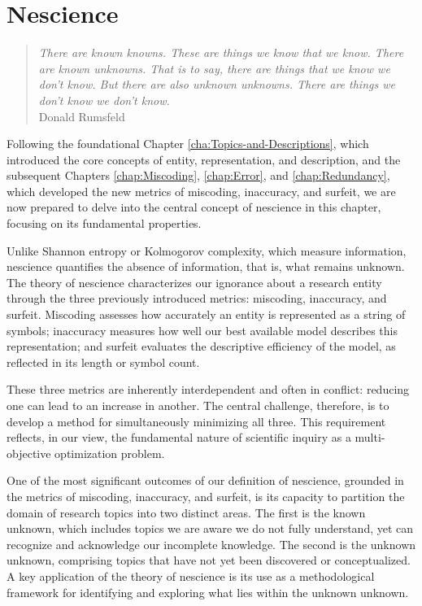 %
%


\chapter{Nescience}
\label{chap:Nescience}

\begin{quote}
\begin{flushright}
\emph{There are known knowns. These are things we know that we know.
There are known unknowns. That is to say, there are things that we know we don't know.
But there are also unknown unknowns. There are things we don't know we don't know.} \\
Donald Rumsfeld
\end{flushright}
\end{quote}
\bigskip

Following the foundational Chapter \ref{cha:Topics-and-Descriptions}, which introduced the core concepts of entity, representation, and description, and the subsequent Chapters \ref{chap:Miscoding}, \ref{chap:Error}, and \ref{chap:Redundancy}, which developed the new metrics of miscoding, inaccuracy, and surfeit, we are now prepared to delve into the central concept of nescience in this chapter, focusing on its fundamental properties.

Unlike Shannon entropy or Kolmogorov complexity, which measure information, nescience quantifies the absence of information, that is, what remains unknown. The theory of nescience characterizes our ignorance about a research entity through the three previously introduced metrics: miscoding, inaccuracy, and surfeit. Miscoding assesses how accurately an entity is represented as a string of symbols; inaccuracy measures how well our best available model describes this representation; and surfeit evaluates the descriptive efficiency of the model, as reflected in its length or symbol count.

These three metrics are inherently interdependent and often in conflict: reducing one can lead to an increase in another. The central challenge, therefore, is to develop a method for simultaneously minimizing all three. This requirement reflects, in our view, the fundamental nature of scientific inquiry as a multi-objective optimization problem.

One of the most significant outcomes of our definition of nescience, grounded in the metrics of miscoding, inaccuracy, and surfeit, is its capacity to partition the domain of research topics into two distinct areas. The first is the known unknown, which includes topics we are aware we do not fully understand, yet can recognize and acknowledge our incomplete knowledge. The second is the unknown unknown, comprising topics that have not yet been discovered or conceptualized. A key application of the theory of nescience is its use as a methodological framework for identifying and exploring what lies within the unknown unknown.


